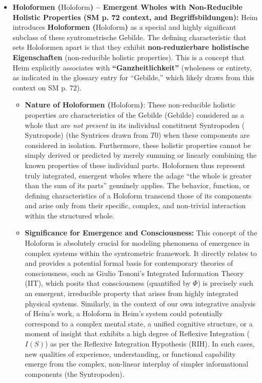 \documentclass[12pt]{article}
\newcommand{\q}[1]{\enquote{#1}}
\newcommand{\syntropode}{\text{Syntropode}}
\newcommand{\syntrixtotalitaet}{T0}
\newcommand{\syntrometrischesGebilde}{\text{Gebilde}}
\newcommand{\holoform}{\text{Holoform}}
\begin{document}
\begin{itemize}
    \item \textbf{Holoformen (\(\holoform\)) – Emergent Wholes with Non-Reducible Holistic Properties (SM p. 72 context, and Begriffsbildungen):}
    Heim introduces \textbf{Holoformen (\(\holoform\))} as a special and highly significant subclass of these syntrometrische Gebilde. The defining characteristic that sets Holoformen apart is that they exhibit \textbf{non-reduzierbare holistische Eigenschaften} (non-reducible holistic properties). This is a concept that Heim explicitly associates with \textbf{\q{Ganzheitlichkeit}} (wholeness or entirety, as indicated in the glossary entry for \q{Gebilde,} which likely draws from this context on SM p. 72).
    \begin{itemize}
        \item \textbf{Nature of Holoformen (\(\holoform\))}: These non-reducible holistic properties are characteristics of the Gebilde (\(\syntrometrischesGebilde\)) considered as a whole that are \textit{not present} in its individual constituent Syntropoden (\(\syntropode\)) (the Syntrices drawn from \( \syntrixtotalitaet \)) when these components are considered in isolation. Furthermore, these holistic properties cannot be simply derived or predicted by merely summing or linearly combining the known properties of these individual parts. Holoformen thus represent truly integrated, emergent wholes where the adage \q{the whole is greater than the sum of its parts} genuinely applies. The behavior, function, or defining characteristics of a Holoform transcend those of its components and arise only from their specific, complex, and non-trivial interaction within the structured whole.
        \item \textbf{Significance for Emergence and Consciousness:} This concept of the Holoform is absolutely crucial for modeling phenomena of emergence in complex systems within the syntrometric framework. It directly relates to and provides a potential formal basis for contemporary theories of consciousness, such as Giulio Tononi's Integrated Information Theory (IIT), which posits that consciousness (quantified by \( \Phi \)) is precisely such an emergent, irreducible property that arises from highly integrated physical systems. Similarly, in the context of our own integrative analysis of Heim's work, a Holoform in Heim's system could potentially correspond to a complex mental state, a unified cognitive structure, or a moment of insight that exhibits a high degree of Reflexive Integration (\( I(S) \)) as per the Reflexive Integration Hypothesis (RIH). In such cases, new qualities of experience, understanding, or functional capability emerge from the complex, non-linear interplay of simpler informational components (the Syntropoden).
    \end{itemize}


\end{itemize}
\end{document}
